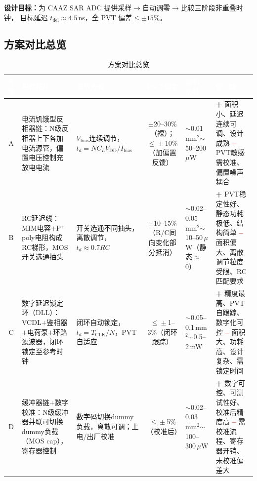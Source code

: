 \documentclass[12pt,a4paper,fontset=none]{ctexart}
\newcommand{\needtable}{\needspace{6cm}}   %
\begin{document}
\textbf{设计目标：}为 CAAZ SAR ADC 提供采样$\to$自动调零$\to$比较三阶段非重叠时钟，
目标延迟 $t_{\mathrm{del}}\approx4.5$\,ns，全 PVT 偏差$\le\pm15\%$。

\needtable
\subsection{方案对比总览}

\begin{table}[H]
\centering
\caption{方案对比总览}
\scriptsize
\begin{tabular}{@{}cL{2.0cm}L{1.8cm}cL{1.6cm}L{3.4cm}@{}}
\toprule
{}
\textcolor{white}{\textbf{方案}} &
\textcolor{white}{\textbf{电路拓扑}} &
\textcolor{white}{\textbf{调节方式}} &
\textcolor{white}{\textbf{PVT偏差}} &
\textcolor{white}{\textbf{面积·功耗}} &
\textcolor{white}{\textbf{优·缺}} \\
\midrule
A &
电流饥饿型反相器链：N级反相器上下各加电流源管，偏置电压控制充放电电流 &
$V_{\mathrm{bias}}$连续调节，$t_d\!=\!N C_L V_{\mathrm{DD}}/I_{\mathrm{bias}}$ &
$\pm$20--30\%（裸）；$\le\!\pm$10\%（加偏置反馈） &
$\sim$0.01\,mm$^2$\newline$\sim$50--200\,$\mu$W &
\textcolor{green!50!black}{\textbf{+}} 面积小、延迟连续可调、设计成熟\newline
\textcolor{red}{\textbf{--}} PVT敏感需校准、偏置噪声耦合 \\
\midrule
B &
RC延迟线：MIM电容$+$P$^+$poly电阻构成RC梯形，MOS开关选通抽头 &
开关选通不同抽头，离散调节，$t_d\!\approx\!0.7RC$ &
$\pm$10--15\%（R/C同向变化部分抵消） &
$\sim$0.02--0.05\,mm$^2$\newline$\sim$10--50\,$\mu$W（静态$\approx$0） &
\textcolor{green!50!black}{\textbf{+}} PVT稳定性好、静态功耗极低、结构简单\newline
\textcolor{red}{\textbf{--}} 面积偏大、离散调节粒度受限、RC匹配要求 \\
\midrule
C &
数字延迟锁定环（DLL）：VCDL$+$鉴相器$+$电荷泵$+$环路滤波器，闭环锁定至参考时钟 &
闭环自动锁定，$t_d\!=\!T_{\mathrm{CLK}}/N$，PVT自适应 &
$\le\!\pm$1--3\%（闭环跟踪） &
$\sim$0.05--0.1\,mm$^2$\newline$\sim$0.5--2\,mW &
\textcolor{green!50!black}{\textbf{+}} 精度最高、PVT自跟踪、数字化可控\newline
\textcolor{red}{\textbf{--}} 面积大、功耗高、设计复杂、需锁定时间 \\
\midrule
D &
缓冲器链$+$数字校准：N级缓冲器并联可切换dummy负载（MOS cap），寄存器控制 &
数字码切换dummy负载，离散可调；上电/出厂校准 &
$\le\!\pm$5\%（校准后） &
$\sim$0.02--0.03\,mm$^2$\newline$\sim$100--300\,$\mu$W &
\textcolor{green!50!black}{\textbf{+}} 数字可控、可测试性好、校准后精度高\newline
\textcolor{red}{\textbf{--}} 需校准流程、寄存器开销、未校准偏差大 \\
\bottomrule
\end{tabular}
\end{table}
\end{document}
